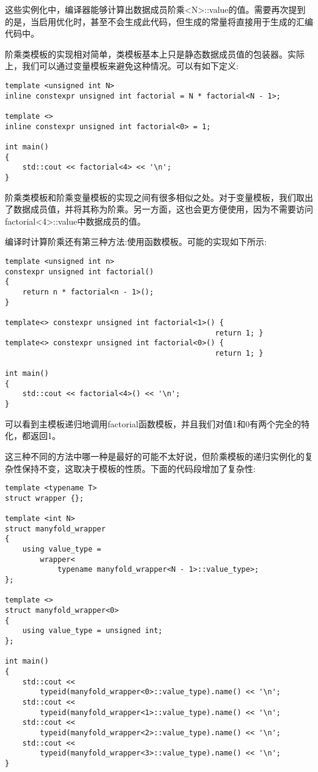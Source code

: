 这些实例化中，编译器能够计算出数据成员阶乘<N>::value的值。需要再次提到的是，当启用优化时，甚至不会生成此代码，但生成的常量将直接用于生成的汇编代码中。

阶乘类模板的实现相对简单，类模板基本上只是静态数据成员值的包装器。实际上，我们可以通过变量模板来避免这种情况。可以有如下定义:

\begin{lstlisting}[style=styleCXX]
template <unsigned int N>
inline constexpr unsigned int factorial = N * factorial<N - 1>;

template <>
inline constexpr unsigned int factorial<0> = 1;

int main()
{
	std::cout << factorial<4> << '\n';
}
\end{lstlisting}

阶乘类模板和阶乘变量模板的实现之间有很多相似之处。对于变量模板，我们取出了数据成员值，并将其称为阶乘。另一方面，这也会更方便使用，因为不需要访问factorial<4>::value中数据成员的值。

编译时计算阶乘还有第三种方法:使用函数模板。可能的实现如下所示:

\begin{lstlisting}[style=styleCXX]
template <unsigned int n>
constexpr unsigned int factorial()
{
	return n * factorial<n - 1>();
}

template<> constexpr unsigned int factorial<1>() {
												return 1; }
template<> constexpr unsigned int factorial<0>() {
												return 1; }

int main()
{
	std::cout << factorial<4>() << '\n';
}
\end{lstlisting}

可以看到主模板递归地调用factorial函数模板，并且我们对值1和0有两个完全的特化，都返回1。

这三种不同的方法中哪一种是最好的可能不太好说，但阶乘模板的递归实例化的复杂性保持不变，这取决于模板的性质。下面的代码段增加了复杂性:

\begin{lstlisting}[style=styleCXX]
template <typename T>
struct wrapper {};

template <int N>
struct manyfold_wrapper
{
	using value_type =
		wrapper<
			typename manyfold_wrapper<N - 1>::value_type>;
};

template <>
struct manyfold_wrapper<0>
{
	using value_type = unsigned int;
};

int main()
{
	std::cout <<
		typeid(manyfold_wrapper<0>::value_type).name() << '\n';
	std::cout <<
		typeid(manyfold_wrapper<1>::value_type).name() << '\n';
	std::cout <<
		typeid(manyfold_wrapper<2>::value_type).name() << '\n';
	std::cout <<
		typeid(manyfold_wrapper<3>::value_type).name() << '\n';
}
\end{lstlisting}

